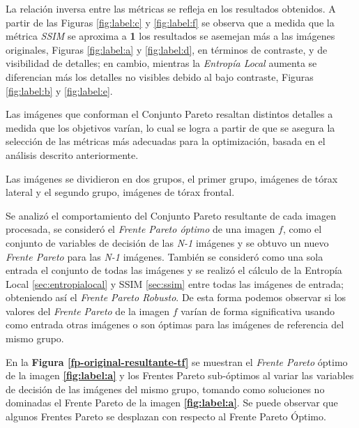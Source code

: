 La relación inversa entre las métricas se refleja en los resultados obtenidos. A partir de las Figuras \ref{fig:label:c} y \ref{fig:label:f} se observa que a medida que la métrica {\it SSIM} se aproxima a \textbf{1} los resultados se asemejan más a las imágenes originales, Figuras \ref{fig:label:a} y \ref{fig:label:d}, en términos de contraste, y de visibilidad de detalles; en cambio, mientras la {\it Entropía Local} aumenta se diferencian más los detalles no visibles debido al bajo contraste, Figuras \ref{fig:label:b} y \ref{fig:label:e}. 

Las imágenes que conforman el Conjunto Pareto resaltan distintos detalles a medida que los objetivos varían, lo cual se logra a partir de que se asegura la selección de las métricas más adecuadas para la optimización, basada en el análisis descrito anteriormente.

Las imágenes se dividieron en dos grupos, el primer grupo, imágenes de tórax lateral y el segundo grupo, imágenes de tórax frontal.

Se analizó el comportamiento del Conjunto Pareto resultante de cada imagen procesada, se consideró el {\it Frente Pareto óptimo} de una imagen $f$, como el conjunto de variables de decisión de las {\it N-1} imágenes y se obtuvo un nuevo {\it Frente Pareto} para las {\it N-1} imágenes. También se consideró como una sola entrada el conjunto de todas las imágenes y se realizó el cálculo de la Entropía Local \ref{sec:entropialocal} y SSIM \ref{sec:ssim} entre todas las imágenes de entrada; obteniendo así el {\it Frente Pareto Robusto}. De esta forma podemos observar si los valores del {\it Frente Pareto} de la imagen $f$ varían de forma significativa usando como entrada otras imágenes o son óptimas para las imágenes de referencia del mismo grupo.


En la \textbf{Figura \ref{fp-original-resultante-tf}} se muestran el {\it Frente Pareto} óptimo de la imagen \textbf{\ref{fig:label:a}} y los Frentes Pareto sub-óptimos al variar las variables de decisión de las imágenes del mismo grupo, tomando como soluciones no dominadas el Frente Pareto de la imagen \textbf{\ref{fig:label:a}}. Se puede observar que algunos Frentes Pareto se desplazan con respecto al Frente Pareto Óptimo.

